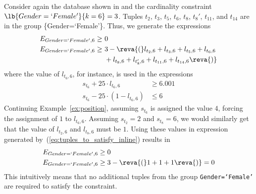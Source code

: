 \begin{example}
\label{ex:deviation}
Consider again the database shown in  and the cardinality constraint $\lb{Gender=`Female'}{k=6} = 3$. %
Tuples $t_2$, $t_3$, $t_5$, $t_6$, $t_8$, $t_8'$, $t_{11}$, and $t_{14}$ are in the group  \{Gender=`Female'\}. Thus, we generate the expressions
\begin{align*}
\begin{split}
E_{Gender=`Female', 6} \geq&~ 0 \\
E_{Gender=`Female', 6} \geq& ~3 - \reva{(}l_{t_2, 6}+l_{t_3, 6}+l_{t_5, 6}+l_{t_6, 6}\\
&~+l_{t_8, 6}+l_{t_8', 6}+l_{t_{11}, 6}+l_{t_{14}, 6}\reva{)}
\end{split}
\end{align*}
where the value of $l_{t_6, 6}$, for instance, is used in the expressions
\begin{align*}
    s_{t_6} + 25 \cdot l_{t_6, 6} &\geq 6.001 \\
    s_{t_6} - 25 \cdot (1 - l_{t_6, 6}) &\leq 6
\end{align*}
Continuing Example~\ref{ex:position}, assuming $s_{t_6}$ is assigned the value $4$, forcing the assignment of $1$ to $l_{t_6, 6}$. Assuming $s_{t_2} = 2$ and $s_{t_8} = 6$, we would similarly get that the value of $l_{t_2, 6}$ and $l_{t_8, 6}$ must be $1$. Using these values in expression generated by~(\ref{eq:tuples_to_satisfy_inline}) results in 
\begin{align*}
E_{Gender=`Female', 6} &\geq 0 \\
E_{Gender=`Female', 6} &\geq 3 - \reva{(}1+1+1\reva{)} = 0
\end{align*}
This intuitively means that no additional tuples from the group {\tt {Gender=`Female'}} are required to satisfy the constraint. 




\end{example}
